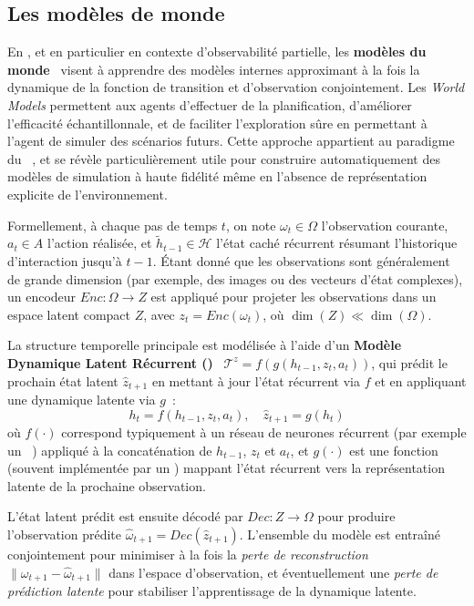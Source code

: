 \subsection{Les modèles de monde}

En , et en particulier en contexte d'observabilité partielle, les \textbf{modèles du monde}~\cite{ha2018recurrent, hafner2020dream} visent à apprendre des modèles internes approximant à la fois la dynamique de la fonction de transition et d'observation conjointement. Les \textit{World Models} permettent aux agents d'effectuer de la planification, d'améliorer l'efficacité échantillonnale, et de faciliter l'exploration sûre en permettant à l'agent de simuler des scénarios futurs. Cette approche appartient au paradigme du ~\cite{moerland2020model}, et se révèle particulièrement utile pour construire automatiquement des modèles de simulation à haute fidélité même en l'absence de représentation explicite de l'environnement.

Formellement, à chaque pas de temps $t$, on note $\omega_t \in \Omega$ l'observation courante, $a_t \in A$ l'action réalisée, et $\tilde{h}_{t-1} \in \mathcal{H}$ l'état caché récurrent résumant l'historique d'interaction jusqu'à $t-1$. Étant donné que les observations sont généralement de grande dimension (par exemple, des images ou des vecteurs d'état complexes), un encodeur $Enc: \Omega \rightarrow Z$ est appliqué pour projeter les observations dans un espace latent compact $Z$, avec $z_t = Enc(\omega_t)$, où $\dim(Z) \ll \dim(\Omega)$.

La structure temporelle principale est modélisée à l'aide d'un \textbf{Modèle Dynamique Latent Récurrent ()}~\cite{hafner2020dream} $\mathcal{T}^{z} = f(g(h_{t-1}, z_t, a_t))$, qui prédit le prochain état latent $\hat{z}_{t+1}$ en mettant à jour l'état récurrent via $f$ et en appliquant une dynamique latente via $g$~:
\[
    h_t = f(h_{t-1}, z_t, a_t), \quad \hat{z}_{t+1} = g(h_t)
\]
où $f(\cdot)$ correspond typiquement à un réseau de neurones récurrent (par exemple un ~\cite{hochreiter1997long}) appliqué à la concaténation de $h_{t-1}$, $z_t$ et $a_t$, et $g(\cdot)$ est une fonction (souvent implémentée par un ) mappant l'état récurrent vers la représentation latente de la prochaine observation.

L'état latent prédit est ensuite décodé par $Dec: Z \rightarrow \Omega$ pour produire l'observation prédite $\hat{\omega}_{t+1} = Dec(\hat{z}_{t+1})$. L'ensemble du modèle est entraîné conjointement pour minimiser à la fois la \emph{perte de reconstruction} $\|\omega_{t+1} - \hat{\omega}_{t+1}\|$ dans l'espace d'observation, et éventuellement une \emph{perte de prédiction latente} pour stabiliser l'apprentissage de la dynamique latente.

